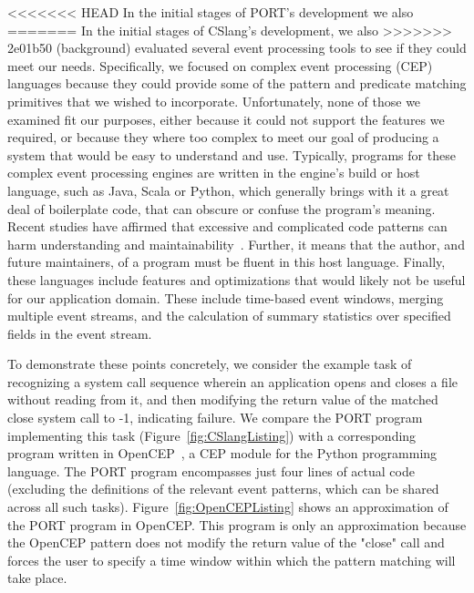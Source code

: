 <<<<<<< HEAD
In the initial stages of PORT's development we also
=======
In the initial stages of CSlang's development, we also
>>>>>>> 2e01b50 (background)
evaluated several event processing tools to see if
they could meet our needs.
Specifically,
we focused on
complex event processing (CEP) languages because they
could
provide some of the pattern and predicate matching primitives
that we wished to
incorporate.
Unfortunately,
none of those we examined fit our purposes,
either because it could not support the features
we required, or because they where too complex
to meet our
goal of producing a system
that would be easy to understand and use.
Typically,
programs for these complex event processing engines are
written in the engine's build or host language,
such as Java,
Scala or
Python,
which generally brings with it a great deal of boilerplate code,
that can obscure or confuse
the program's meaning.
Recent studies
have affirmed that excessive and complicated code
patterns can harm
understanding and
maintainability~\cite{misunderstandings}.
Further,
it means that the author,
and future maintainers,
of a
program must be fluent in this host language.
Finally,
these languages include features and optimizations
that would likely not be useful for our application domain.
These include time-based event windows,
merging multiple event streams,
and the calculation of
summary statistics over specified fields in the event stream.

To demonstrate these points concretely, we consider the example task of recognizing a system call sequence wherein an
application opens and closes a file without reading from it, and then modifying the return value of the matched close system call to -1, indicating failure.
We compare the PORT program implementing this task (Figure~\ref{fig:CSlangListing}) with a corresponding program written in OpenCEP~\cite{open_cep_website}, a CEP module for the Python programming language.
The PORT program encompasses just four lines of actual code (excluding the definitions of the relevant event patterns, which can be shared across all such tasks).
Figure~\ref{fig:OpenCEPListing} shows an approximation of the PORT program in
OpenCEP.
This program is only
an approximation because the OpenCEP pattern does not modify the return
value of the "close" call and forces the user to specify a time window
within which the pattern matching will take place.


